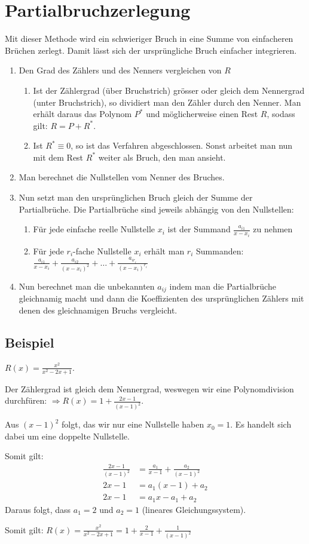 \section{Partialbruchzerlegung}
Mit dieser Methode wird ein schwieriger Bruch in eine Summe von einfacheren
Brüchen zerlegt. Damit lässt sich der ursprüngliche Bruch einfacher integrieren.

\begin{enumerate}
	\item Den Grad des Zählers und des Nenners vergleichen von $R$
	\begin{enumerate}
		\item Ist der Zählergrad (über Bruchstrich) grösser oder gleich dem Nennergrad
		(unter Bruchstrich), so dividiert man den Zähler durch den Nenner. Man erhält
		daraus das Polynom $P^*$ und möglicherweise einen Rest $R$, sodass gilt: $R =
		P + R^*$.
		\item Ist $R^* \equiv 0$, so ist das Verfahren abgeschlossen. Sonst arbeitet
		man nun mit dem Rest $R^*$ weiter als Bruch, den man ansieht.
	\end{enumerate}
	\item Man berechnet die Nullstellen vom Nenner des Bruches.
	\item Nun setzt man den ursprünglichen Bruch gleich der Summe der
	Partialbrüche. Die Partialbrüche sind jeweils abhängig von den Nullstellen:
	\begin{enumerate}
		\item Für jede einfache reelle Nullstelle $x_i$ ist der Summand
		$\frac{a_{i1}}{x-x_i}$ zu nehmen
		\item Für jede $r_i$-fache Nullstelle $x_i$ erhält man $r_i$ Summanden:
		$\frac{a_{i1}}{x-x_i} + \frac{a_{i2}}{(x-x_i)^2} + \ldots +
		\frac{a_{ir_i}}{(x-x_i)^{r_i}}$
	\end{enumerate}
	\item Nun berechnet man die unbekannten $a_{ij}$ indem man die Partialbrüche
	gleichnamig macht und dann die Koeffizienten des ursprünglichen Zählers mit
	denen des gleichnamigen Bruchs vergleicht.
\end{enumerate}

\subsection{Beispiel}
$R(x) = \frac{x^2}{x^2-2x+1}$.

Der Zählergrad ist gleich dem Nennergrad,
weswegen wir eine Polynomdivision durchfüren: $\Rightarrow R(x) = 1 +
\frac{2x-1}{(x-1)^2}$.

Aus $(x-1)^2$ folgt, das wir nur eine Nullstelle haben $x_0 = 1$. Es handelt
sich dabei um eine doppelte Nullstelle.

Somit gilt:
\begin{align*}
\frac{2x-1}{(x-1)^2} &= \frac{a_1}{x-1} + \frac{a_2}{(x-1)^2}\\
2x-1 &= a_1(x-1) + a_2\\
2x-1 &= a_1 x - a_1 + a_2
\end{align*}
Daraus folgt, dass $a_1 = 2$ und $a_2 = 1$ (lineares Gleichungssystem).

Somit gilt: $R(x) = \frac{x^2}{x^2-2x+1} = 1 + \frac{2}{x-1} +
\frac{1}{(x-1)^2}$
